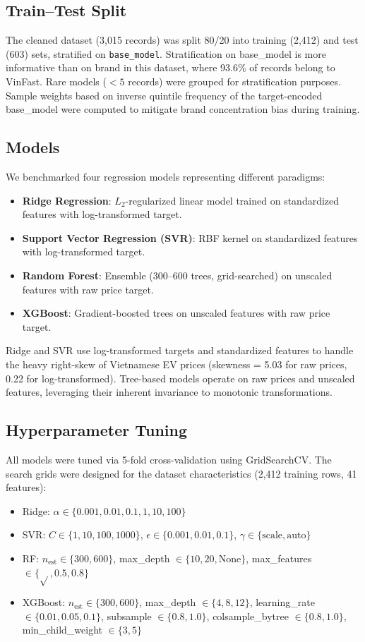 \documentclass[lettersize,journal]{IEEEtran}
\begin{document}
\subsection{Train--Test Split}
The cleaned dataset (3,015 records) was split 80/20 into training (2,412)
and test (603) sets, stratified on \texttt{base\_model}. Stratification on
base\_model is more informative than on brand in this dataset, where 93.6\%
of records belong to VinFast. Rare models ($< 5$ records) were grouped for
stratification purposes. Sample weights based on inverse quintile frequency
of the target-encoded base\_model were computed to mitigate brand
concentration bias during training.

\subsection{Models}
We benchmarked four regression models representing different paradigms:
\begin{itemize}
    \item \textbf{Ridge Regression}: $L_2$-regularized linear model trained
    on standardized features with log-transformed target.
    \item \textbf{Support Vector Regression (SVR)}: RBF kernel on
    standardized features with log-transformed target.
    \item \textbf{Random Forest}: Ensemble (300--600 trees, grid-searched)
    on unscaled features with raw price target.
    \item \textbf{XGBoost}: Gradient-boosted trees on unscaled features with
    raw price target.
\end{itemize}

Ridge and SVR use log-transformed targets and standardized features to
handle the heavy right-skew of Vietnamese EV prices (skewness = 5.03 for
raw prices, 0.22 for log-transformed). Tree-based models operate on raw
prices and unscaled features, leveraging their inherent invariance to
monotonic transformations.

\subsection{Hyperparameter Tuning}
All models were tuned via 5-fold cross-validation using GridSearchCV. The
search grids were designed for the dataset characteristics (2,412 training
rows, 41 features):
\begin{itemize}
    \item Ridge: $\alpha \in \{0.001, 0.01, 0.1, 1, 10, 100\}$
    \item SVR: $C \in \{1, 10, 100, 1000\}$, $\epsilon \in \{0.001, 0.01, 0.1\}$,
    $\gamma \in \{\text{scale}, \text{auto}\}$
    \item RF: $n_{\text{est}} \in \{300, 600\}$, max\_depth $\in \{10, 20, \text{None}\}$,
    max\_features $\in \{\sqrt{}, 0.5, 0.8\}$
    \item XGBoost: $n_{\text{est}} \in \{300, 600\}$, max\_depth $\in \{4, 8, 12\}$,
    learning\_rate $\in \{0.01, 0.05, 0.1\}$, subsample $\in \{0.8, 1.0\}$,
    colsample\_bytree $\in \{0.8, 1.0\}$, min\_child\_weight $\in \{3, 5\}$
\end{itemize}
\end{document}
